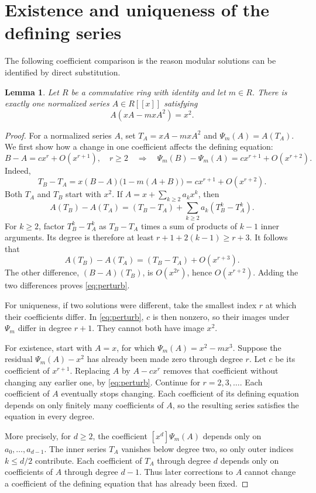 \documentclass[11pt,a4paper]{article}
\newtheorem{lemma}[theorem]{Lemma}
\theoremstyle{remark}
\begin{document}
\section{Existence and uniqueness of the defining series}

The following coefficient comparison is the reason modular solutions can
be identified by direct substitution.

\begin{lemma}\label{lem:unique}
Let $R$ be a commutative ring with identity and let $m\in R$. There is exactly
one normalized series $A\in R[[x]]$ satisfying
\[
 A(xA-mxA^2)=x^2.
\]
\end{lemma}

\begin{proof}
For a normalized series $A$, set
$T_A=xA-mxA^2$ and $\Psi_m(A)=A(T_A)$.
We first show how a change in one coefficient affects the defining equation:
\begin{equation}\label{eq:perturb}
 B-A=cx^r+O(x^{r+1}),\quad r\ge2
 \quad\Longrightarrow\quad
 \Psi_m(B)-\Psi_m(A)=cx^{r+1}+O(x^{r+2}).
\end{equation}
Indeed,
\[
 T_B-T_A=x(B-A)\bigl(1-m(A+B)\bigr)
 =cx^{r+1}+O(x^{r+2}).
\]
Both $T_A$ and $T_B$ start with $x^2$. If
$A=x+\sum_{k\ge2}a_kx^k$, then
\[
 A(T_B)-A(T_A)=(T_B-T_A)+\sum_{k\ge2}a_k(T_B^k-T_A^k).
\]
For $k\ge2$, factor $T_B^k-T_A^k$ as $T_B-T_A$ times a sum of
products of $k-1$ inner arguments. Its degree is therefore at least
$r+1+2(k-1)\ge r+3$. It follows that
\[
 A(T_B)-A(T_A)=(T_B-T_A)+O(x^{r+3}).
\]
The other difference, $(B-A)(T_B)$, is $O(x^{2r})$, hence $O(x^{r+2})$.
Adding the two differences proves \eqref{eq:perturb}.

For uniqueness, if two solutions were different, take the smallest index
$r$ at which their coefficients differ. In \eqref{eq:perturb}, $c$ is then
nonzero, so their images under $\Psi_m$ differ in degree $r+1$.
They cannot both have image $x^2$.

For existence, start with $A=x$, for which $\Psi_m(A)=x^2-mx^3$.
Suppose the residual $\Psi_m(A)-x^2$ has already been made zero through
degree $r$. Let $c$ be its coefficient of $x^{r+1}$. Replacing $A$ by
$A-cx^r$ removes that coefficient without changing any earlier one, by
\eqref{eq:perturb}. Continue for $r=2,3,\ldots$. Each coefficient of $A$
eventually stops changing. Each coefficient of its defining equation depends
on only finitely many coefficients of $A$, so the resulting series satisfies
the equation in every degree.

More precisely, for $d\ge2$, the coefficient $[x^d]\Psi_m(A)$ depends
only on $a_0,\ldots,a_{d-1}$. The inner series $T_A$ vanishes below
degree two, so only outer indices $k\le d/2$ contribute. Each coefficient
of $T_A$ through degree $d$ depends only on coefficients of $A$ through
degree $d-1$. Thus later corrections to $A$ cannot change a coefficient
of the defining equation that has already been fixed.
\end{proof}
\end{document}
